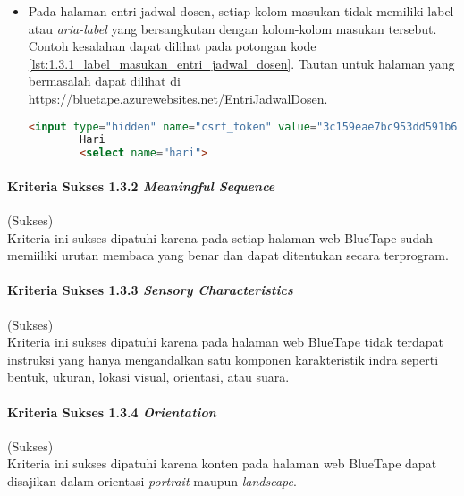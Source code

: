 \begin{itemize}
    \item Pada halaman entri jadwal dosen, setiap kolom masukan tidak memiliki label atau \textit{aria-label} yang bersangkutan dengan kolom-kolom masukan tersebut. Contoh kesalahan dapat dilihat pada potongan kode \ref{lst:1.3.1_label_masukan_entri_jadwal_dosen}. Tautan untuk halaman yang bermasalah dapat dilihat di \url{https://bluetape.azurewebsites.net/EntriJadwalDosen}.
    \begin{lstlisting}[frame=single, label={lst:1.3.1_label_masukan_entri_jadwal_dosen}, language=HTML, caption=Kriteria Sukses 1.3.1 - Tidak Terdapat Label pada Kolom Masukan di Halaman Entri Jadwal Dosen]
        <input type="hidden" name="csrf_token" value="3c159eae7bc953dd591b679c080ed066"/>
        Hari
        <select name="hari">
    \end{lstlisting}
\end{itemize} 

\paragraph{Kriteria Sukses 1.3.2 \textit{Meaningful Sequence}}
\label{par:kepatuhan_bluetape_kriteria_sukses_1.3.2}
(Sukses)\\

Kriteria ini sukses dipatuhi karena pada setiap halaman web BlueTape sudah memiiliki urutan membaca yang benar dan dapat ditentukan secara terprogram. 

\paragraph{Kriteria Sukses 1.3.3 \textit{Sensory Characteristics}}
\label{par:kepatuhan_bluetape_kriteria_sukses_1.3.3}
(Sukses)\\

Kriteria ini sukses dipatuhi karena pada halaman web BlueTape tidak terdapat instruksi yang hanya mengandalkan satu komponen karakteristik indra seperti bentuk, ukuran, lokasi visual, orientasi,
atau suara.

\paragraph{Kriteria Sukses 1.3.4 \textit{Orientation}}
\label{par:kepatuhan_bluetape_kriteria_sukses_1.3.4}
(Sukses)\\

Kriteria ini sukses dipatuhi karena konten pada halaman web BlueTape dapat disajikan dalam orientasi \textit{portrait} maupun \textit{landscape}.

